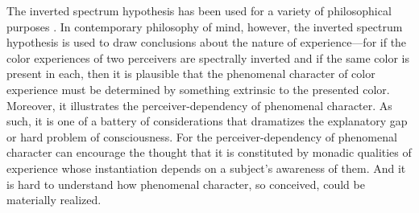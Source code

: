 \documentclass[12pt]{article}
\begin{document}
% 

The inverted spectrum hypothesis has been used for a variety of philosophical purposes \citep[see][for some of these]{Byrne:2005ve}. In contemporary philosophy of mind, however, the inverted spectrum hypothesis is used to draw conclusions about the nature of experience---for if the color experiences of two perceivers are spectrally inverted and if the same color is present in each, then it is plausible that the phenomenal character of color experience must be determined by something extrinsic to the presented color. Moreover, it illustrates the perceiver-dependency of phenomenal character. As such, it is one of a battery of considerations that dramatizes the explanatory gap or hard problem of consciousness. For the perceiver-dependency of phenomenal character can encourage the thought that it is constituted by monadic qualities of experience whose instantiation depends on a subject's awareness of them. And it is hard to understand how phenomenal character, so conceived, could be materially realized.
\end{document}
